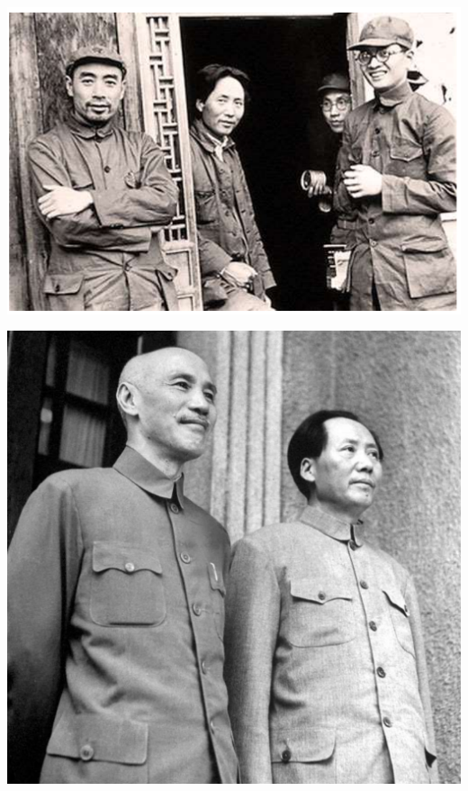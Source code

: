 \documentclass[
  10pt,
  ignorenonframetext,
]{beamer}
\begin{document}
\begin{frame}
\vspace{0.3cm}

\begin{center}\includegraphics[width=0.9\linewidth]{Figs/yanan_new} \end{center}
\end{frame}

\begin{frame}
\vspace{0.3cm}

\begin{center}\includegraphics[width=0.6\linewidth]{Figs/chongqing_new} \end{center}
\end{frame}
\end{document}
